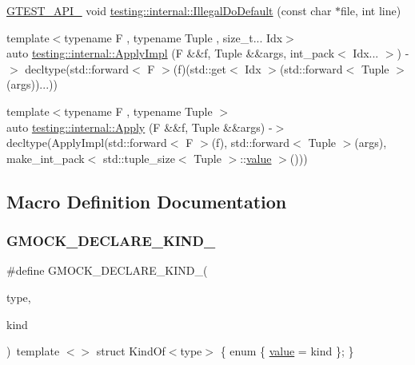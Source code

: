 \begin{DoxyCompactItemize}
\item 
\mbox{\hyperlink{_obj__test_2lib_2googletest-release-1_88_81_2googletest_2include_2gtest_2internal_2gtest-port_8h_aa73be6f0ba4a7456180a94904ce17790}{G\+T\+E\+S\+T\+\_\+\+A\+P\+I\+\_\+}} void \mbox{\hyperlink{namespacetesting_1_1internal_aa67e1e9d28122eedffbb7b6636824f2d}{testing\+::internal\+::\+Illegal\+Do\+Default}} (const char $\ast$file, int line)
\item 
{\footnotesize template$<$typename F , typename Tuple , size\+\_\+t... Idx$>$ }\\auto \mbox{\hyperlink{namespacetesting_1_1internal_a3a3b201170370a28f0acaf0de785cded}{testing\+::internal\+::\+Apply\+Impl}} (F \&\&f, Tuple \&\&args, int\+\_\+pack$<$ Idx... $>$) -\/$>$ decltype(std\+::forward$<$ F $>$(f)(std\+::get$<$ Idx $>$(std\+::forward$<$ Tuple $>$(args))...))
\item 
{\footnotesize template$<$typename F , typename Tuple $>$ }\\auto \mbox{\hyperlink{namespacetesting_1_1internal_aa4d652d33ef1ce203c40ebe2d3ca6b1b}{testing\+::internal\+::\+Apply}} (F \&\&f, Tuple \&\&args) -\/$>$ decltype(Apply\+Impl(std\+::forward$<$ F $>$(f), std\+::forward$<$ Tuple $>$(args), make\+\_\+int\+\_\+pack$<$ std\+::tuple\+\_\+size$<$ Tuple $>$\+::\mbox{\hyperlink{_obj__test_2lib_2googletest-master_2googlemock_2test_2gmock-matchers__test_8cc_a337b8a670efc0b086ad3af163f3121b6}{value}} $>$()))
\end{DoxyCompactItemize}


\subsection{Macro Definition Documentation}
\mbox{\label{_obj__test_2lib_2googletest-master_2googlemock_2include_2gmock_2internal_2gmock-internal-utils_8h_a7d8a1871d7a30543a4e1882a8b2bbcd8}} 
\subsubsection{\texorpdfstring{GMOCK\_DECLARE\_KIND\_}{GMOCK\_DECLARE\_KIND\_}}
{\footnotesize\ttfamily \#define G\+M\+O\+C\+K\+\_\+\+D\+E\+C\+L\+A\+R\+E\+\_\+\+K\+I\+N\+D\+\_\+(\begin{DoxyParamCaption}\item[{}]{type,  }\item[{}]{kind }\end{DoxyParamCaption})~template $<$$>$ struct Kind\+Of$<$type$>$ \{ enum \{ \mbox{\hyperlink{_obj__test_2lib_2googletest-master_2googlemock_2test_2gmock-matchers__test_8cc_a337b8a670efc0b086ad3af163f3121b6}{value}} = kind \}; \}}

